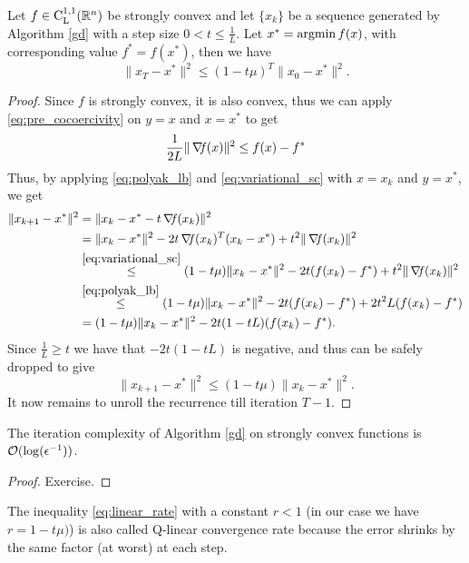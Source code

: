 \documentclass[10pt,a4paper]{article}
\begin{document}
\begin{theorem}\label{thm:strongly_convex}
	Let $f\in \mathord{\mathrm{C^{1,1}_{L}}}(\mathbb{R}^n)$ be strongly convex and let $\{x_k\}$ be a sequence generated by Algorithm \ref{gd} with a step size $0<t\leq\frac{1}{L}$. Let $x^*= \operatorname*{argmin} f(x)$, with corresponding value $f^*=f(x^*)$, then we have 
	\begin{equation}\label{eq:strongly_convex_convergence}
		\|x_T - x^*\|^2 \leq (1 - t\mu)^T\|x_0 - x^*\|^2.
	\end{equation}
\end{theorem}
\begin{proof}
	Since $f$ is strongly convex, it is also convex, thus we can apply \eqref{eq:pre_cocoercivity} on $y=x$ and $x=x^*$ to get
	\begin{equation}\label{eq:polyak_lb}
		\frac{1}{2L}\|\operatorname*{\mathit{\nabla \!f}}(x) \|^2 \leq f(x)-f^*
	\end{equation}
Thus, by applying \eqref{eq:polyak_lb} and \eqref{eq:variational_sc} with $x=x_k$ and $y=x^*$, we get 
\begin{align*}
	\|x_{k+1} - x^*\|^2 &= \|x_k - x^* - t\operatorname*{\mathit{\nabla \!f}}(x_k)\|^2\\
	&= \|x_k - x^*\|^2 - 2t \operatorname*{\mathit{\nabla \!f}}(x_k)^T (x_k - x^*) + t^2\|\operatorname*{\mathit{\nabla \!f}}(x_k)\|^2\\
	&\stackrel{\eqref{eq:variational_sc}}{\leq} (1-t\mu)\|x_k - x^*\|^2 - 2t(f(x_k) - f^*) + t^2\|\operatorname*{\mathit{\nabla \!f}}(x_k)\|^2\\
	&\stackrel{\eqref{eq:polyak_lb}}{\leq} (1-t\mu)\|x_k - x^*\|^2 - 2t(f(x_k) - f^*) + 2t^2 L(f(x_k) - f^*)\\
	&= (1-t\mu)\|x_k - x^*\|^2 - 2t(1 - t L)(f(x_k) - f^*).
\end{align*}
Since $\frac{1}{L} \geq t$ we have that $-2t(1 - t L)$ is negative, and thus can be safely dropped to give
\begin{equation}\label{eq:linear_rate}
	\|x_{k+1} - x^*\|^2 \leq (1 - t\mu)\|x_k - x^*\|^2.
\end{equation}
It now remains to unroll the recurrence till iteration $T-1$.
\end{proof}
\begin{corollary}
The iteration complexity of Algorithm \eqref{gd} on strongly convex functions is $\mathcal{O}(\log(\epsilon^{-1}))$.
\end{corollary}
\begin{proof}
Exercise.
\end{proof}
\begin{remark}
	The inequality \eqref{eq:linear_rate} with a constant $r<1$ (in our case we have $r=1-t\mu)$) is also called Q-linear convergence rate because the error shrinks by the same factor (at worst) at each step.
\end{remark}
\end{document}

